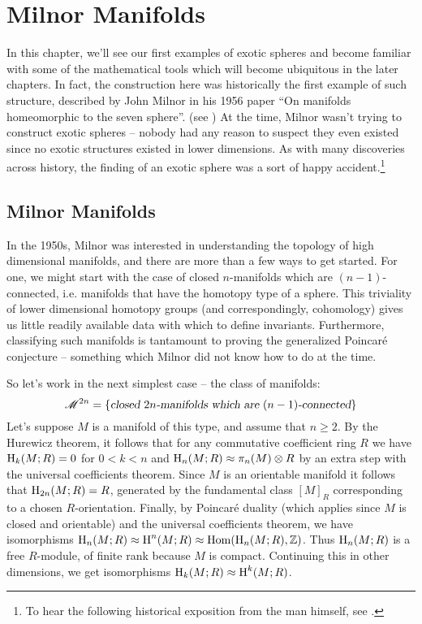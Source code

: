 \chapter{Milnor Manifolds}\label{ch:milnor}

In this chapter, we'll see our first examples of exotic spheres and become familiar with some of the mathematical tools which will become ubiquitous in the later chapters.
In fact, the construction here was historically the first example of such structure, described by John Milnor in his 1956 paper ``On manifolds homeomorphic to the seven sphere''. (see \cite{milnor1956manifolds}) At the time, Milnor wasn't trying to construct exotic spheres -- nobody had any reason to suspect they even existed since no exotic structures existed in lower dimensions. As with many discoveries across history, the finding of an exotic sphere was a sort of happy accident.\footnote{To hear the following historical exposition from the man himself, see \cite{milnor2000exotic}.}

\section{Milnor Manifolds}

In the 1950s, Milnor was interested in understanding the topology of high dimensional manifolds, and there are more than a few ways to get started. For one, we might start with the case of closed $n$-manifolds which are $(n-1)$-connected, i.e. manifolds that have the homotopy type of a sphere. This triviality of lower dimensional homotopy groups (and correspondingly, cohomology) gives us little readily available data with which to define invariants. Furthermore, classifying such manifolds is tantamount to proving the generalized Poincar\'e conjecture -- something which Milnor did not know how to do at the time.

So let's work in the next simplest case -- the class of manifolds:
\[\mathscr{M}^{2n} = \left\{\textsl{closed $2n$-manifolds which are $(n-1)$-connected}\right\}\]
Let's suppose $M$ is a manifold of this type, and assume that $n\geq 2$. By the Hurewicz theorem, it follows that for any commutative coefficient ring $R$ we have $\operatorname{H}_k(M; R)=0$ for $0<k<n$ and $\operatorname{H}_n(M; R)\approx \pi_n(M)\otimes R$ by an extra step with the universal coefficients theorem. Since $M$ is an orientable manifold it follows that $\operatorname{H}_{2n}(M; R)=R$, generated by the fundamental class $[M]_R$ corresponding to a chosen $R$-orientation.
Finally, by Poincar\'e duality (which applies since $M$ is closed and orientable) and the universal coefficients theorem, we have isomorphisms $\operatorname{H}_n(M; R)\approx \operatorname{H}^n(M; R)\approx \operatorname{Hom}(\operatorname{H}_n(M; R), \mathbb{Z})$. Thus $\operatorname{H}_n(M;R)$ is a free $R$-module, of finite rank because $M$ is compact. Continuing this in other dimensions, we get isomorphisms $\operatorname{H}_k(M; R)\approx \operatorname{H}^k(M; R)$.

